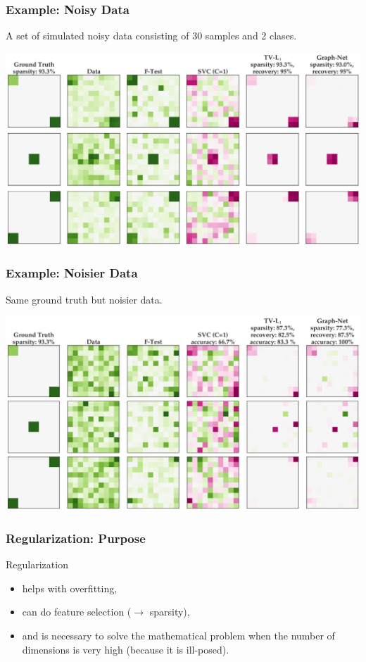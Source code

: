 \documentclass[11pt]{beamer}
\begin{document}
\begin{frame}[t]
  \frametitle{Example: Noisy Data}
  A set of simulated noisy data consisting of 30 samples and 2 clases. 
  \begin{center}
    \includegraphics[scale=0.25]{figures/weights_synthetic_data_2.62_cbc.png} 
  \end{center}
\end{frame}
\begin{frame}[t]
  \frametitle{Example: Noisier Data}
  Same ground truth but noisier data.
  \begin{center}
    \includegraphics[scale=0.25]{figures/weights_sparse_synthetic_data_1.39_cbc.png} 
  \end{center}
\end{frame}
\begin{frame}
  \frametitle{Regularization: Purpose}
  Regularization
  \begin{itemize}
  \item helps with overfitting,
  \item can do feature selection ($\rightarrow$ sparsity),
  \item and is necessary to solve the mathematical problem when the number of
    dimensions is very high (because it is ill-posed).
  \end{itemize}

\end{frame}
\end{document}
